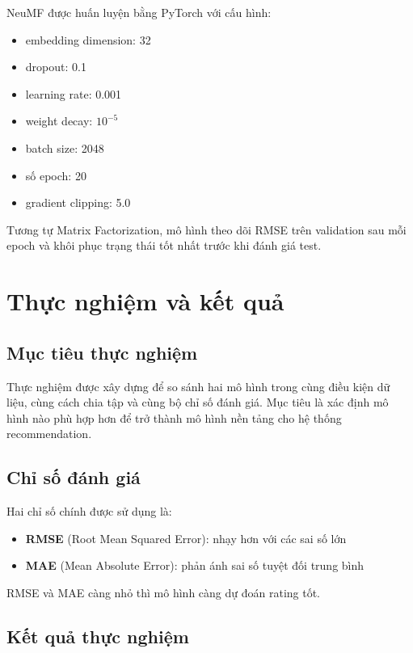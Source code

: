 \documentclass[12pt,a4paper]{article}
\begin{document}
NeuMF được huấn luyện bằng PyTorch với cấu hình:

\begin{itemize}[leftmargin=1.5cm]
    \item embedding dimension: 32
    \item dropout: 0.1
    \item learning rate: 0.001
    \item weight decay: \(10^{-5}\)
    \item batch size: 2048
    \item số epoch: 20
    \item gradient clipping: 5.0
\end{itemize}

Tương tự Matrix Factorization, mô hình theo dõi RMSE trên validation sau mỗi epoch và khôi phục trạng thái tốt nhất trước khi đánh giá test.

\section{Thực nghiệm và kết quả}

\subsection{Mục tiêu thực nghiệm}

Thực nghiệm được xây dựng để so sánh hai mô hình trong cùng điều kiện dữ liệu, cùng cách chia tập và cùng bộ chỉ số đánh giá. Mục tiêu là xác định mô hình nào phù hợp hơn để trở thành mô hình nền tảng cho hệ thống recommendation.

\subsection{Chỉ số đánh giá}

Hai chỉ số chính được sử dụng là:

\begin{itemize}[leftmargin=1.5cm]
    \item \textbf{RMSE} (Root Mean Squared Error): nhạy hơn với các sai số lớn
    \item \textbf{MAE} (Mean Absolute Error): phản ánh sai số tuyệt đối trung bình
\end{itemize}

RMSE và MAE càng nhỏ thì mô hình càng dự đoán rating tốt.

\subsection{Kết quả thực nghiệm}
\end{document}

